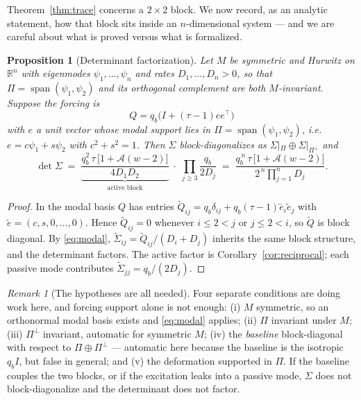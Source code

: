 \documentclass[11pt]{article}
\theoremstyle{plain}
\newtheorem{proposition}[theorem]{Proposition}
\theoremstyle{definition}
\theoremstyle{remark}
\newtheorem{remark}[theorem]{Remark}
\newcommand{\Real}{\mathbb{R}}
\newcommand{\Sig}{\Sigma}
\newcommand{\Aco}{\mathcal{A}}
\newcommand{\T}{^{\!\top}}
\begin{document}
Theorem~\ref{thm:trace} concerns a $2\times2$ block. We now record, as an analytic
statement, how that block sits inside an $n$-dimensional system --- and we are careful about what
is proved versus what is formalized.

\begin{proposition}[Determinant factorization]\label{prop:factor}
Let $M$ be symmetric and Hurwitz on $\Real^n$ with eigenmodes $\psi_1,\dots,\psi_n$ and rates
$D_1,\dots,D_n>0$, so that $\Pi=\operatorname{span}(\psi_1,\psi_2)$ and its orthogonal
complement are both $M$-invariant. Suppose the forcing is
\begin{equation}
  Q = q_b\bigl(I+(\tau-1)ee\T\bigr) \label{eq:Qambient}
\end{equation}
with $e$ a unit vector whose modal support lies in $\Pi=\operatorname{span}(\psi_1,\psi_2)$, i.e.
$e=c\psi_1+s\psi_2$ with $c^2+s^2=1$. Then $\Sig$ block-diagonalizes as
$\Sig|_\Pi\oplus\Sig|_{\Pi^{\perp}}$ and
\begin{equation}
  \det\Sig \;=\; \underbrace{\frac{q_b^2\,\tau\,\bigl[1+\Aco(w-2)\bigr]}{4D_1D_2}}_{\text{active block}}
  \;\cdot\;
  \prod_{j\ge3}\frac{q_b}{2D_j}
  \;=\; \frac{q_b^{\,n}\,\tau\,\bigl[1+\Aco(w-2)\bigr]}{2^{\,n}\prod_{j=1}^{n}D_j}. \label{eq:factored}
\end{equation}
\end{proposition}

\begin{proof}
In the modal basis $Q$ has entries $\widetilde Q_{ij}=q_b\delta_{ij}+q_b(\tau-1)\tilde e_i\tilde e_j$
with $\tilde e=(c,s,0,\dots,0)$. Hence $\widetilde Q_{ij}=0$ whenever $i\le2<j$ or $j\le2<i$, so
$\widetilde Q$ is block diagonal. By \eqref{eq:modal}, $\widetilde\Sig_{ij}=\widetilde Q_{ij}/(D_i+D_j)$
inherits the same block structure, and the determinant factors. The active factor is
Corollary~\ref{cor:reciprocal}; each passive mode contributes $\widetilde\Sig_{jj}=q_b/(2D_j)$.
\end{proof}

\begin{remark}[The hypotheses are all needed]\label{rem:factorhyp}
Four separate conditions are doing work here, and forcing support alone is not enough:
(i) $M$ symmetric, so an orthonormal modal basis exists and \eqref{eq:modal} applies;
(ii) $\Pi$ invariant under $M$; (iii) $\Pi^{\perp}$ invariant, automatic for symmetric $M$;
(iv) the \emph{baseline} block-diagonal with respect to $\Pi\oplus\Pi^{\perp}$ --- automatic
here because the baseline is the isotropic $q_bI$, but false in general; and (v) the
deformation supported in $\Pi$. If the baseline couples the two blocks, or if the excitation
leaks into a passive mode, $\Sig$ does not block-diagonalize and the determinant does not
factor.
\end{remark}
\end{document}
